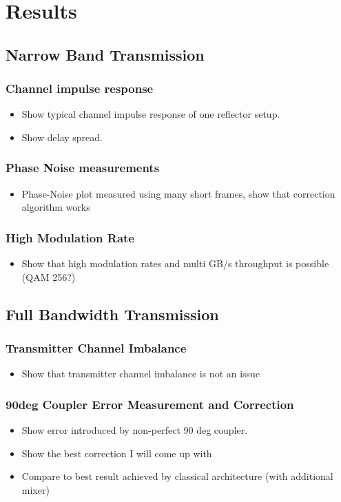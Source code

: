\chapter{Results}
\section{Narrow Band Transmission}
\subsection{Channel impulse response}
\begin{itemize}
\item Show typical channel impulse response of one reflector setup.
\item Show delay spread.
\end{itemize}

\subsection{Phase Noise measurements}
\begin{itemize}
\item Phase-Noise plot measured using many short frames, show that correction algorithm works
\end{itemize}

\subsection{High Modulation Rate}
\begin{itemize}
\item Show that high modulation rates and multi GB/s throughput is possible (\gls{QAM} 256?)
\end{itemize}

\section{Full Bandwidth Transmission}
\subsection{Transmitter Channel Imbalance}
\begin{itemize}
\item Show that transmitter channel imbalance is not an issue
\end{itemize}

\subsection{90deg Coupler Error Measurement and Correction}
\begin{itemize}
\item Show error introduced by non-perfect 90 deg coupler.
\item Show the best correction I will come up with
\item Compare to best result achieved by classical architecture (with additional mixer)
\end{itemize}

